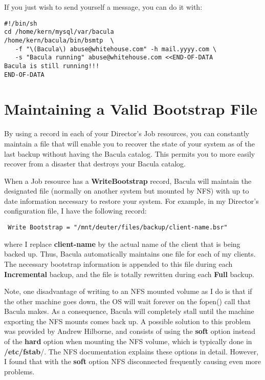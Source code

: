 If you just wish to send yourself a message, you can do it with:

\footnotesize
\begin{verbatim}
#!/bin/sh
cd /home/kern/mysql/var/bacula
/home/kern/bacula/bin/bsmtp  \
   -f "\(Bacula\) abuse@whitehouse.com" -h mail.yyyy.com \
   -s "Bacula running" abuse@whitehouse.com <<END-OF-DATA
Bacula is still running!!!
END-OF-DATA
\end{verbatim}
\normalsize

\section{Maintaining a Valid Bootstrap File}
\label{bootstrap}

By using a
 record in each of your
Director's Job resources, you can constantly maintain a
\ilink{bootstrap}{BootstrapChapter} file that will enable you to
recover the state of your system as of the last backup without having the
Bacula catalog. This permits you to more easily recover from a disaster that
destroys your Bacula catalog.

When a Job resource has a {\bf WriteBootstrap} record, Bacula will maintain
the designated file (normally on another system but mounted by NFS) with up to
date information necessary to restore your system. For example, in my
Director's configuration file, I have the following record:

\footnotesize
\begin{verbatim}
 Write Bootstrap = "/mnt/deuter/files/backup/client-name.bsr"
\end{verbatim}
\normalsize

where I replace {\bf client-name} by the actual name of the client that is
being backed up. Thus, Bacula automatically maintains one file for each of my
clients. The necessary bootstrap information is appended to this file during
each {\bf Incremental} backup, and the file is totally rewritten during each
{\bf Full} backup.

Note, one disadvantage of writing to an NFS mounted volume as I do is
that if the other machine goes down, the OS will wait forever on the fopen()
call that Bacula makes. As a consequence, Bacula will completely stall until
the machine exporting the NFS mounts comes back up. A possible solution to this
problem was provided by Andrew Hilborne, and consists of using the {\bf soft}
option instead of the {\bf hard} option when mounting the NFS volume, which is
typically done in {\bf /etc/fstab}/. The NFS documentation explains these
options in detail. However, I found that with the {\bf soft} option
NFS disconnected frequently causing even more problems.


